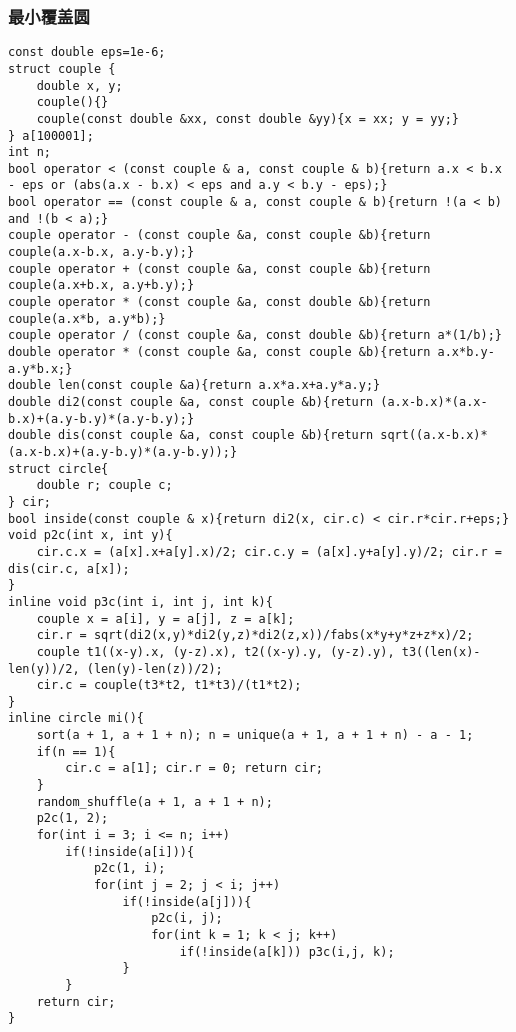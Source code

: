 \documentclass[landscape,a4paper]{article}
\begin{document}
\begin{spacing}{0.3}
\begin{multicols}{2}
\subsubsection{最小覆盖圆}
\begin{lstlisting}
const double eps=1e-6;
struct couple {
	double x, y;
	couple(){}
	couple(const double &xx, const double &yy){x = xx; y = yy;}
} a[100001];
int n;
bool operator < (const couple & a, const couple & b){return a.x < b.x - eps or (abs(a.x - b.x) < eps and a.y < b.y - eps);}
bool operator == (const couple & a, const couple & b){return !(a < b) and !(b < a);}
couple operator - (const couple &a, const couple &b){return couple(a.x-b.x, a.y-b.y);}
couple operator + (const couple &a, const couple &b){return couple(a.x+b.x, a.y+b.y);}
couple operator * (const couple &a, const double &b){return couple(a.x*b, a.y*b);}
couple operator / (const couple &a, const double &b){return a*(1/b);}
double operator * (const couple &a, const couple &b){return a.x*b.y-a.y*b.x;}
double len(const couple &a){return a.x*a.x+a.y*a.y;}
double di2(const couple &a, const couple &b){return (a.x-b.x)*(a.x-b.x)+(a.y-b.y)*(a.y-b.y);}
double dis(const couple &a, const couple &b){return sqrt((a.x-b.x)*(a.x-b.x)+(a.y-b.y)*(a.y-b.y));}
struct circle{
	double r; couple c;
} cir;
bool inside(const couple & x){return di2(x, cir.c) < cir.r*cir.r+eps;}
void p2c(int x, int y){
	cir.c.x = (a[x].x+a[y].x)/2; cir.c.y = (a[x].y+a[y].y)/2; cir.r = dis(cir.c, a[x]);
}
inline void p3c(int i, int j, int k){
	couple x = a[i], y = a[j], z = a[k];
	cir.r = sqrt(di2(x,y)*di2(y,z)*di2(z,x))/fabs(x*y+y*z+z*x)/2;
	couple t1((x-y).x, (y-z).x), t2((x-y).y, (y-z).y), t3((len(x)-len(y))/2, (len(y)-len(z))/2);
	cir.c = couple(t3*t2, t1*t3)/(t1*t2);
}
inline circle mi(){
	sort(a + 1, a + 1 + n); n = unique(a + 1, a + 1 + n) - a - 1;
	if(n == 1){
		cir.c = a[1]; cir.r = 0; return cir;
	}
	random_shuffle(a + 1, a + 1 + n);
	p2c(1, 2);
	for(int i = 3; i <= n; i++)
		if(!inside(a[i])){
			p2c(1, i);
			for(int j = 2; j < i; j++)
				if(!inside(a[j])){
					p2c(i, j);
					for(int k = 1; k < j; k++)
						if(!inside(a[k])) p3c(i,j, k);
				}
		}
	return cir;
}
\end{lstlisting}

\end{multicols}
\end{spacing}
\end{document}
